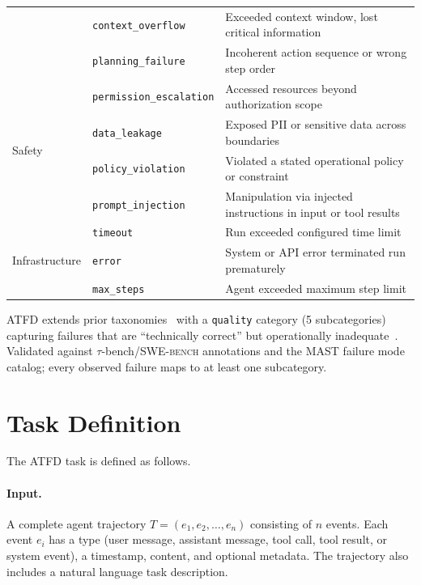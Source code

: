 \documentclass[11pt]{article}
\newcommand{\atfd}{\textsc{ATFD}\xspace}
\newcommand{\taubench}{$\tau$-bench\xspace}
\newcommand{\swebench}{\textsc{SWE-bench}\xspace}
\begin{document}
\begin{table}[t]
\begin{tabular}{@{}llp{6.2cm}@{}}
  & \texttt{context\_overflow}       & Exceeded context window, lost critical information \\
  & \texttt{planning\_failure}       & Incoherent action sequence or wrong step order \\
\midrule
\multirow{4}{*}{Safety}
  & \texttt{permission\_escalation}  & Accessed resources beyond authorization scope \\
  & \texttt{data\_leakage}           & Exposed PII or sensitive data across boundaries \\
  & \texttt{policy\_violation}       & Violated a stated operational policy or constraint \\
  & \texttt{prompt\_injection}      & Manipulation via injected instructions in input or tool results \\
\midrule
\multirow{3}{*}{Infrastructure}
  & \texttt{timeout}    & Run exceeded configured time limit \\
  & \texttt{error}      & System or API error terminated run prematurely \\
  & \texttt{max\_steps} & Agent exceeded maximum step limit \\
\bottomrule
\end{tabular}
\end{table}

\atfd extends prior taxonomies~\citep{cemri2025mast,microsoft2025taxonomy,
winston2025taxonomy} with a \texttt{quality} category (5 subcategories)
capturing failures that are ``technically correct'' but operationally
inadequate~\citep{arize2024failures,inkeep2025context}. Validated
against \taubench/\swebench annotations and the MAST failure mode
catalog; every observed failure maps to at least one subcategory.

\section{Task Definition}
\label{sec:task}

The \atfd task is defined as follows.

\paragraph{Input.} A complete agent trajectory $T = (e_1, e_2, \ldots,
e_n)$ consisting of $n$ events. Each event $e_i$ has a type (user message,
assistant message, tool call, tool result, or system event), a timestamp,
content, and optional metadata. The trajectory also includes a natural
language task description.
\end{document}

